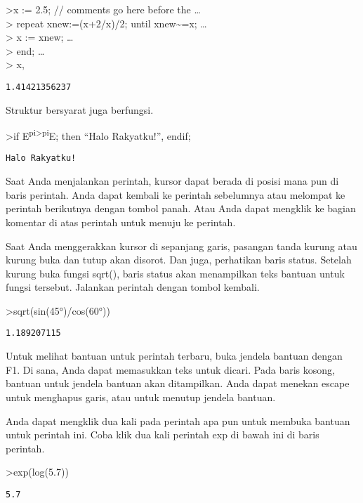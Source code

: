\documentclass[
]{book}
\begin{document}
\textgreater x := 2.5; // comments go here before the \ldots{}\\
\textgreater{} repeat xnew:=(x+2/x)/2; until xnew\textasciitilde=x; \ldots{}\\
\textgreater{} x := xnew; \ldots{}\\
\textgreater{} end; \ldots{}\\
\textgreater{} x,

\begin{verbatim}
1.41421356237
\end{verbatim}

Struktur bersyarat juga berfungsi.

\textgreater if E\textsuperscript{pi\textgreater pi}E; then ``Halo Rakyatku!'', endif;

\begin{verbatim}
Halo Rakyatku!
\end{verbatim}

Saat Anda menjalankan perintah, kursor dapat berada di posisi mana pun di baris perintah. Anda dapat kembali ke perintah sebelumnya atau melompat ke perintah berikutnya dengan tombol panah. Atau Anda dapat mengklik ke bagian komentar di atas perintah untuk menuju ke perintah.

Saat Anda menggerakkan kursor di sepanjang garis, pasangan tanda kurung atau kurung buka dan tutup akan disorot. Dan juga, perhatikan baris status. Setelah kurung buka fungsi sqrt(), baris status akan menampilkan teks bantuan untuk fungsi tersebut. Jalankan perintah dengan tombol kembali.

\textgreater sqrt(sin(45°)/cos(60°))

\begin{verbatim}
1.189207115
\end{verbatim}

Untuk melihat bantuan untuk perintah terbaru, buka jendela bantuan dengan F1. Di sana, Anda dapat memasukkan teks untuk dicari. Pada baris kosong, bantuan untuk jendela bantuan akan ditampilkan. Anda dapat menekan escape untuk menghapus garis, atau untuk menutup jendela bantuan.

Anda dapat mengklik dua kali pada perintah apa pun untuk membuka bantuan untuk perintah ini. Coba klik dua kali perintah exp di bawah ini di baris perintah.

\textgreater exp(log(5.7))

\begin{verbatim}
5.7
\end{verbatim}
\end{document}
